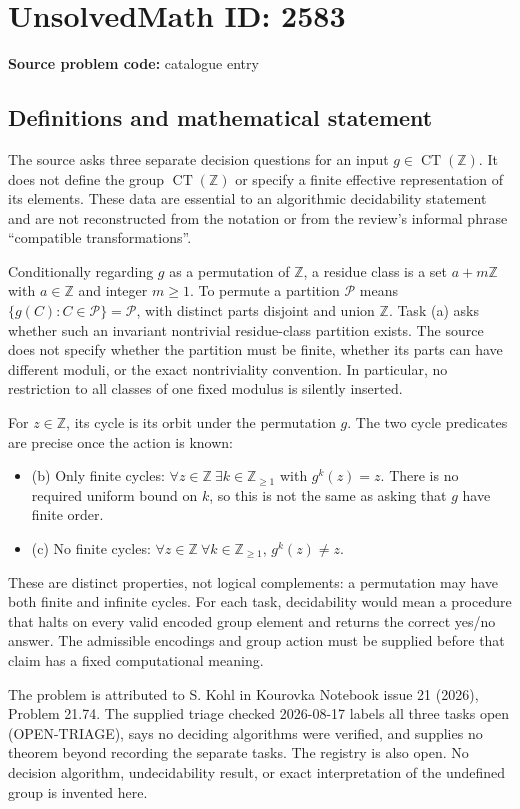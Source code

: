\documentclass[11pt]{article}
\newcommand{\Z}{\mathbb{Z}}
\begin{document}
\section*{UnsolvedMath ID: 2583}
\textbf{Source problem code:} catalogue entry
\subsection{Definitions and mathematical statement}
The source asks three separate decision questions for an input $g\in\operatorname{CT}(\Z)$. It does not define the group $\operatorname{CT}(\Z)$ or specify a finite effective representation of its elements. These data are essential to an algorithmic decidability statement and are not reconstructed from the notation or from the review's informal phrase ``compatible transformations''.

Conditionally regarding $g$ as a permutation of $\Z$, a residue class is a set $a+m\Z$ with $a\in\Z$ and integer $m\geq1$. To permute a partition $\mathcal P$ means $\{g(C):C\in\mathcal P\}=\mathcal P$, with distinct parts disjoint and union $\Z$. Task (a) asks whether such an invariant nontrivial residue-class partition exists. The source does not specify whether the partition must be finite, whether its parts can have different moduli, or the exact nontriviality convention. In particular, no restriction to all classes of one fixed modulus is silently inserted.

For $z\in\Z$, its cycle is its orbit under the permutation $g$. The two cycle predicates are precise once the action is known:
\begin{itemize}
\item (b) Only finite cycles: $\forall z\in\Z\ \exists k\in\Z_{\geq1}$ with $g^k(z)=z$. There is no required uniform bound on $k$, so this is not the same as asking that $g$ have finite order.
\item (c) No finite cycles: $\forall z\in\Z\ \forall k\in\Z_{\geq1}$, $g^k(z)\ne z$.
\end{itemize}
These are distinct properties, not logical complements: a permutation may have both finite and infinite cycles. For each task, decidability would mean a procedure that halts on every valid encoded group element and returns the correct yes/no answer. The admissible encodings and group action must be supplied before that claim has a fixed computational meaning.

The problem is attributed to S. Kohl in Kourovka Notebook issue 21 (2026), Problem 21.74. The supplied triage checked 2026-08-17 labels all three tasks open (OPEN-TRIAGE), says no deciding algorithms were verified, and supplies no theorem beyond recording the separate tasks. The registry is also open. No decision algorithm, undecidability result, or exact interpretation of the undefined group is invented here.
\end{document}
